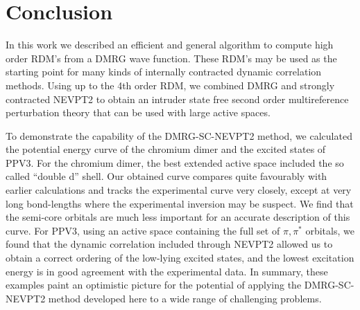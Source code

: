 
\section{Conclusion}

In this work we described an efficient and general algorithm to compute high order RDM's from a DMRG wave function.
These RDM's may be used as the starting point for many kinds of internally contracted dynamic correlation methods.
Using up to the 4th order RDM, we combined DMRG and strongly contracted NEVPT2 to obtain
an intruder state free second order multireference perturbation theory that can be used with large active spaces.

To demonstrate the capability of the DMRG-SC-NEVPT2 method, we calculated the potential energy curve of the chromium dimer and the excited 
states of PPV3. For the chromium dimer, the best extended active space included the so called ``double d'' shell.
Our obtained curve compares quite favourably with earlier calculations and tracks the experimental curve very closely, except
at very long bond-lengths where the experimental inversion may be suspect. We find that the semi-core orbitals
are much less important for an accurate description of this curve.
For PPV3, using an active space containing the full set of $\pi, \pi^*$ orbitals, we found that the dynamic correlation included through NEVPT2 allowed us to obtain
a correct ordering of the low-lying excited states, and the lowest excitation energy is in good agreement with
the experimental data. In summary, these examples paint an optimistic picture for the potential of applying the
DMRG-SC-NEVPT2 method developed here to a wide range of challenging problems.
